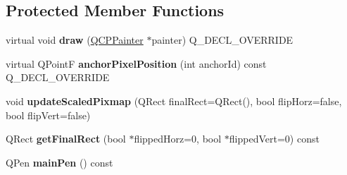 \subsection*{Protected Member Functions}
\begin{DoxyCompactItemize}
\item 
\mbox{\label{classQCPItemPixmap_a9538a7d37fe20a4ff4bb2cb5bbbf2b48}} 
virtual void {\bfseries draw} (\hyperlink{classQCPPainter}{Q\+C\+P\+Painter} $\ast$painter) Q\+\_\+\+D\+E\+C\+L\+\_\+\+O\+V\+E\+R\+R\+I\+DE
\item 
\mbox{\label{classQCPItemPixmap_a5803d8e173bc4d48619fc43701db32e5}} 
virtual Q\+PointF {\bfseries anchor\+Pixel\+Position} (int anchor\+Id) const Q\+\_\+\+D\+E\+C\+L\+\_\+\+O\+V\+E\+R\+R\+I\+DE
\item 
\mbox{\label{classQCPItemPixmap_a8bced3027b326b290726cd1979c7cfc6}} 
void {\bfseries update\+Scaled\+Pixmap} (Q\+Rect final\+Rect=Q\+Rect(), bool flip\+Horz=false, bool flip\+Vert=false)
\item 
\mbox{\label{classQCPItemPixmap_a4e7d803e5093c457a109f8fae56677c2}} 
Q\+Rect {\bfseries get\+Final\+Rect} (bool $\ast$flipped\+Horz=0, bool $\ast$flipped\+Vert=0) const
\item 
\mbox{\label{classQCPItemPixmap_aad6dddd67163831538d40023a98a9fe7}} 
Q\+Pen {\bfseries main\+Pen} () const
\end{DoxyCompactItemize}
